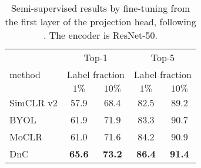 \documentclass[final]{cvpr}
\newcommand\baseline{MoCLR}
\begin{document}
\begin{table}[h]
\caption{Semi-supervised results by fine-tuning from the first layer of the projection head, following \cite{chen2020simple}. The encoder is ResNet-50.}
\label{tab:semi_results_hidden}
\begin{center}
\begin{small}
\begin{tabular}{lcccc}
\toprule
 & \multicolumn{2}{c}{Top-1} & \multicolumn{2}{c}{Top-5}\\
method & \multicolumn{2}{c}{Label fraction} & \multicolumn{2}{c}{Label fraction}\\
 & $1\%$ & $10\%$ & $1\%$ & $10\%$ \\
\midrule
SimCLR v2     & 57.9 & 68.4  & 82.5 & 89.2\\
BYOL          & 61.9 & 71.9  & 83.3 & 90.7 \\
\baseline{}   & 61.0 & 71.6  & 84.2 & 90.9 \\
DnC           & \cellcolor{DnCBG}\textbf{65.6} & \cellcolor{DnCBG}\textbf{73.2}    
              & \cellcolor{DnCBG}\textbf{86.4} & \cellcolor{DnCBG}\textbf{91.4} \\
\bottomrule
\end{tabular}
\end{small}
\end{center}
\end{table}
\end{document}
